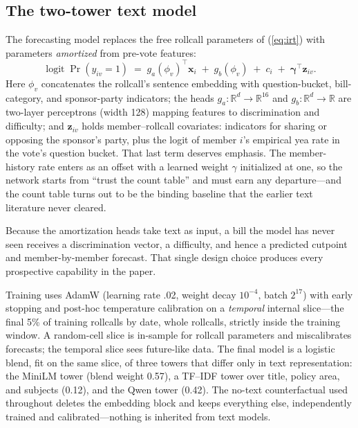 \documentclass[12pt]{article}
\begin{document}
\subsection{The two-tower text model}
\label{sec:tower}

The forecasting model replaces the free rollcall parameters of
(\ref{eq:irt}) with parameters \emph{amortized} from pre-vote features:
\begin{equation}
\operatorname{logit}\Pr(y_{iv}=1) \;=\;
g_a(\phi_v)^\top \mathbf{x}_i \;+\; g_b(\phi_v) \;+\; c_i \;+\;
\boldsymbol\gamma^\top \mathbf{z}_{iv}.
\label{eq:tower}
\end{equation}
Here $\phi_v$ concatenates the rollcall's sentence embedding with
question-bucket, bill-category, and sponsor-party indicators; the heads
$g_a: \mathbb{R}^d \to \mathbb{R}^{16}$ and
$g_b: \mathbb{R}^d \to \mathbb{R}$ are two-layer perceptrons (width
128) mapping features to discrimination and difficulty; and
$\mathbf{z}_{iv}$ holds member--rollcall covariates: indicators for
sharing or opposing the sponsor's party, plus the logit of member $i$'s
empirical yea rate in the vote's question bucket. That last term
deserves emphasis. The member-history rate enters as an offset with a
learned weight $\gamma$ initialized at one, so the network starts from
``trust the count table'' and must earn any departure---and the count
table turns out to be the binding baseline that the earlier text
literature never cleared.

Because the amortization heads take text as input, a bill the model has
never seen receives a discrimination vector, a difficulty, and hence a
predicted cutpoint and member-by-member forecast. That single design
choice produces every prospective capability in the paper.

Training uses AdamW (learning rate .02, weight decay $10^{-4}$, batch
$2^{17}$) with early stopping and post-hoc temperature calibration on a
\emph{temporal} internal slice---the final 5\% of training rollcalls by
date, whole rollcalls, strictly inside the training window. A
random-cell slice is in-sample for rollcall parameters and miscalibrates
forecasts; the temporal slice sees future-like data. The final model is
a logistic blend, fit on the same slice, of three towers that differ
only in text representation: the MiniLM tower (blend weight 0.57), a
TF--IDF tower over title, policy area, and subjects (0.12), and the
Qwen tower (0.42). The no-text counterfactual used throughout deletes
the embedding block and keeps everything else, independently trained and
calibrated---nothing is inherited from text models.
\end{document}
